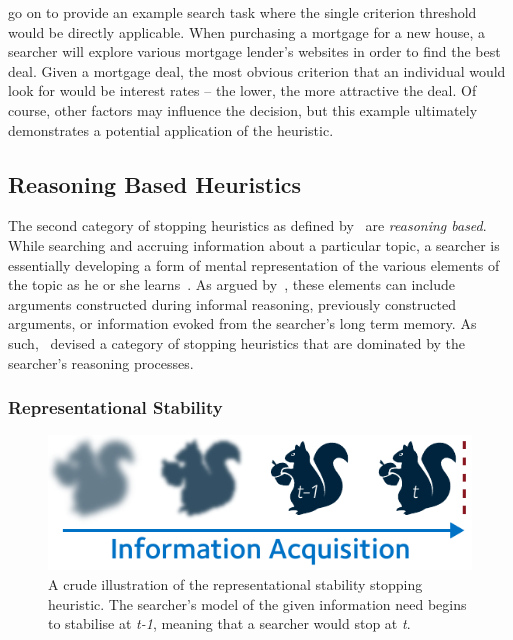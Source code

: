 \cite{browne2005stopping_rules} go on to provide an example search task where the single criterion threshold would be directly applicable. When purchasing a mortgage for a new house, a searcher will explore various mortgage lender's websites in order to find the best deal. Given a mortgage deal, the most obvious criterion that an individual would look for would be interest rates -- the lower, the more attractive the deal. Of course, other factors may influence the decision, but this example ultimately demonstrates a potential application of the heuristic.

\subsection{Reasoning Based Heuristics}
The second category of stopping heuristics as defined by~\citep{nickles1995judgment} are \emph{reasoning based}. While searching and accruing information about a particular topic, a searcher is essentially developing a form of mental representation of the various elements of the topic as he or she learns~\citep{yates1990decision_making}. As argued by~\citep{nickles1995judgment}, these elements can include arguments constructed during informal reasoning, previously constructed arguments, or information evoked from the searcher's long term memory. As such,~\citep{nickles1995judgment} devised a category of stopping heuristics that are dominated by the searcher's reasoning processes.

\subsubsection{Representational Stability}\label{sec:stopping_background:heuristics:reasoning:representational}
\begin{figure}
    \begin{center}
    \vspace*{-10mm}
    \includegraphics[width=1\textwidth]{figures/ch3-representational.pdf}
    \end{center}
    \vspace*{-4mm}
    \caption[Representational stability stopping heuristic]{A crude illustration of the representational stability stopping heuristic. The searcher's model of the given information need begins to stabilise at \emph{t-1}, meaning that a searcher would stop at \emph{t}.}
    \label{fig:representational_heuristic}
\end{figure}


